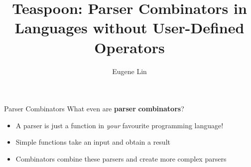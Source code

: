 \documentclass[aspectratio=169]{beamer}
\title{Teaspoon: Parser Combinators in Languages without User-Defined Operators}
\date{\displaydate{presentation_date}}
\author{Eugene Lin}
\institute{Imperial College London}
\begin{document}
    \maketitle
    \begin{frame}{Parser Combinators}
            What even are \textbf<2>{parser} \textbf<4>{combinators}?
        \begin{itemize}
            \itemsep0.75em
            \item<2-> A parser is just a function in \textit{your} favourite programming language!
            \item<3-> Simple functions take an input and obtain a result
            \item<4-> Combinators combine these parsers and create more complex parsers
        \end{itemize}
    \end{frame}
\end{document}
